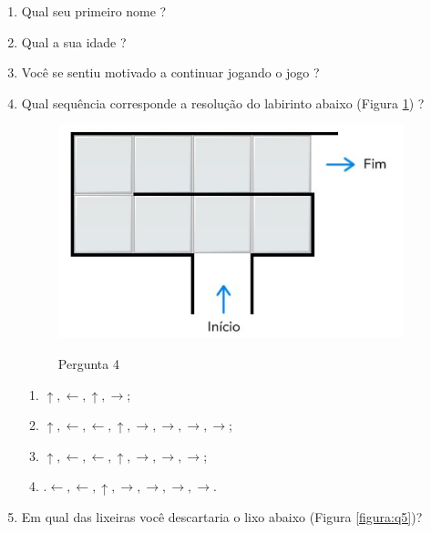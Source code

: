 \begin{enumerate}
    \item  Qual seu primeiro nome ? 
    
    \item Qual a sua idade ?
    
    \item Você se sentiu motivado a continuar jogando o jogo ?
    
    \item   Qual sequência corresponde a resolução do labirinto abaixo (Figura \ref{figura:q4}) ?
    
    \begin{figure}[H]
    \caption{Pergunta 4}
    \centering
    \includegraphics[width=10cm]{Imagens/Cap5/Q4.png}
    \label{figura:q4}
    \end{figure}

     \begin{enumerate}
     \item $\uparrow,  \leftarrow, \uparrow, \rightarrow$;
     \item $\uparrow, \leftarrow, \leftarrow, \uparrow, \rightarrow, \rightarrow, \rightarrow, \rightarrow$;
     \item  $\uparrow, \leftarrow, \leftarrow, \uparrow, \rightarrow, \rightarrow, \rightarrow$;
     \item .$\leftarrow, \leftarrow, \uparrow, \rightarrow, \rightarrow, \rightarrow, \rightarrow$.
     \end{enumerate}

    \item   Em qual das lixeiras você descartaria o lixo abaixo (Figura \ref{figura:q5})?
    

\end{enumerate}
